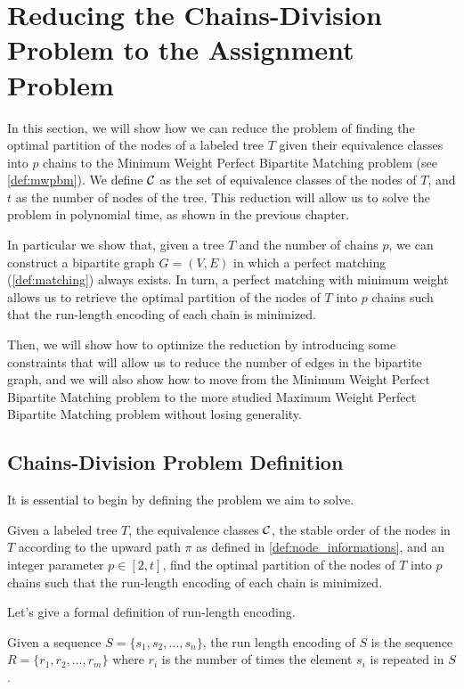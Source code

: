 \section{Reducing the Chains-Division Problem to the Assignment Problem}
In this section, we will show how we can reduce the problem of finding the optimal partition of the nodes of a labeled tree $T$ given their equivalence classes into $p$ chains to the Minimum Weight Perfect Bipartite Matching problem (see \cref{def:mwpbm}). We define $\mathcal{C}$ as the set of equivalence classes of the nodes of $T$, and $t$ as the number of nodes of the tree. This reduction will allow us to solve the problem in polynomial time, as shown in the previous chapter.

In particular we show that, given a tree $T$ and the number of chains $p$, we can construct a bipartite graph $G = (V, E)$ in which a perfect matching (\cref{def:matching}) always exists. In turn, a perfect matching with minimum weight allows us to retrieve the optimal partition of the nodes of $T$ into $p$ chains such that the run-length encoding of each chain is minimized.

Then, we will show how to optimize the reduction by introducing some constraints that will allow us to reduce the number of edges in the bipartite graph, and we will also show how to move from the Minimum Weight Perfect Bipartite Matching problem to the more studied Maximum Weight Perfect Bipartite Matching problem without losing generality.

\subsection{Chains-Division Problem Definition}
It is essential to begin by defining the problem we aim to solve.

\begin{definition} \label{def:problem_def}
    Given a labeled tree $T$, the equivalence classes $\mathcal{C}$, the stable order of the nodes in $T$ according to the upward path $\pi$ as defined in \cref{def:node_informations}, and an integer parameter $p \in [2, t]$, find the optimal partition of the nodes of $T$ into $p$ chains such that the run-length encoding of each chain is minimized.
\end{definition}

Let's give a formal definition of run-length encoding.
\begin{definition}
    Given a sequence $S = \{s_1, s_2, \dots, s_n\}$, the run length encoding of $S$ is the sequence $R = \{r_1, r_2, \dots, r_m\}$ where $r_i$ is the number of times the element $s_i$ is repeated in $S$.
\end{definition}


